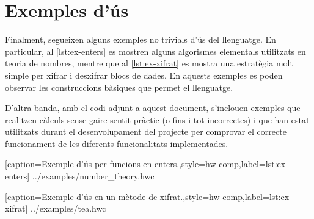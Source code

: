 
\section{Exemples d'ús}

Finalment, segueixen alguns exemples no trivials d'ús del llenguatge. En 
particular, al \autoref{lst:ex-enters} es mostren alguns algorismes 
elementals utilitzats en teoria de nombres, mentre que al 
\autoref{lst:ex-xifrat} es mostra una estratègia molt simple per xifrar i 
desxifrar blocs de dades. En aquests exemples es poden observar les 
construccions bàsiques que permet el llenguatge.

D'altra banda, amb el codi adjunt a aquest document, s'inclouen exemples que 
realitzen càlculs sense gaire sentit pràctic (o fins i tot incorrectes) i que 
han estat utilitzats durant el desenvolupament del projecte per comprovar el 
correcte funcionament de les diferents funcionalitats implementades.

%
  [caption={Exemple d'ús per funcions en enters.},style=hw-comp,label={lst:ex-enters}]%
  {../examples/number_theory.hwc}

%
  [caption={Exemple d'ús en un mètode de xifrat.},style=hw-comp,label={lst:ex-xifrat}]%
  {../examples/tea.hwc}


